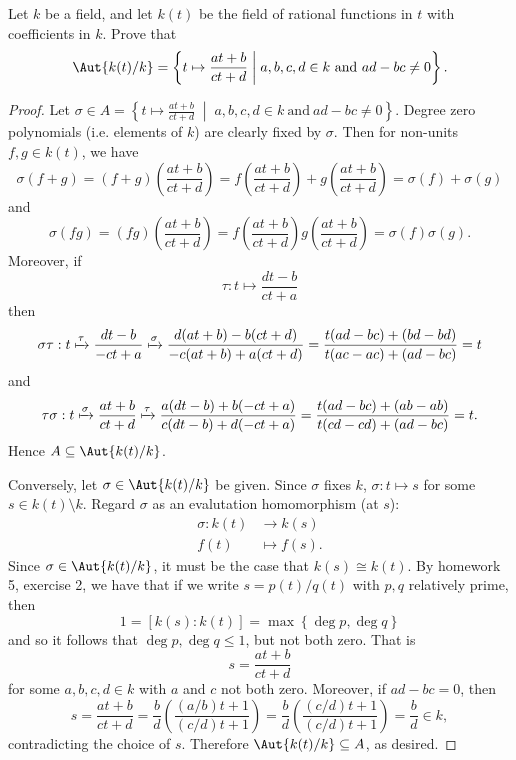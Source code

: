 \documentclass[10pt]{amsart}
\begin{document}
\begin{thm}
  Let $k$ be a field, and let $k(t)$ be the field of rational functions in $t$ with coefficients in $k$.
  Prove that 
  $$\Aut{k(t)/k} = \left\{t \mapsto \frac{at + b}{ct + d} \;\middle\vert\; a, b, c, d \in k\ \text{and}\ ad - bc \neq 0\right\}.$$
  
  \begin{proof}
    Let $\sigma \in A = \left\{t \mapsto \frac{at + b}{ct + d} \;\middle\vert\; a, b, c, d \in k\ \text{and}\ ad - bc \neq 0\right\}$.
    Degree zero polynomials (i.e. elements of $k$) are clearly fixed by $\sigma$.
    Then for non-units $f,g \in k(t)$, we have 
    $$\sigma(f + g) = (f + g)(\frac{at + b}{ct + d}) = f(\frac{at + b}{ct + d}) + g(\frac{at + b}{ct + d}) = \sigma(f) + \sigma(g)$$
    and
    $$\sigma(fg) = (fg)\left(\frac{at + b}{ct + d}\right) = f\left(\frac{at + b}{ct + d}\right) g\left(\frac{at + b}{ct + d}\right) = \sigma(f)\sigma(g).$$
    Moreover, if $$\tau \colon t \mapsto \frac{dt - b}{ct + a}$$
    then
    $$\sigma\tau: t \xmapsto{\tau} \frac{dt - b}{-ct + a} \xmapsto{\sigma} \frac{d(at + b) - b(ct + d)}{-c(at + b) + a(ct + d)} = \frac{t(ad - bc) + (bd - bd)}{t(ac - ac) + (ad - bc)} = t$$
    and
    $$\tau\sigma: t \xmapsto{\sigma} \frac{at + b}{ct + d} \xmapsto{\tau} \frac{a(dt - b) + b(-ct + a)}{c(dt - b) + d(-ct + a)} = \frac{t(ad - bc) + (ab - ab)}{t(cd - cd) + (ad - bc)} = t.$$
    Hence $A \subseteq \Aut{k(t)/k}$.
    
    Conversely, let $\sigma \in \Aut{k(t)/k}$ be given.
    Since $\sigma$ fixes $k$, $\sigma \colon t \mapsto s$ for some $s \in k(t) \setminus k$.
    Regard $\sigma$ as an evalutation homomorphism (at $s$):
    \begin{align*}
      \sigma \colon k(t) & \rightarrow k(s)\\
      f(t) & \mapsto f(s).
    \end{align*}
    Since $\sigma \in \Aut{k(t)/k}$, it must be the case that $k(s) \cong k(t)$.
    By homework 5, exercise 2, we have that if we write $s = p(t)/q(t)$ with $p, q$ relatively prime, then 
    $$1 = [k(s) : k(t)] = \max\left\{\deg{p}, \deg{q}\right\}$$
    and so it follows that $\deg{p}, \deg{q} \leq 1$, but not both zero.
    That is 
    $$s = \frac{at + b}{ct + d}$$ 
    for some $a,b,c,d \in k$ with $a$ and $c$ not both zero.
    Moreover, if $ad - bc = 0$, then 
    $$s = \frac{at + b}{ct + d} = \frac{b}{d} \left(\frac{(a/b)t + 1}{(c/d)t + 1}\right) = \frac{b}{d} \left(\frac{(c/d)t + 1}{(c/d)t + 1}\right) = \frac{b}{d} \in k,$$
    contradicting the choice of $s$.
    Therefore $\Aut{k(t)/k} \subseteq A$, as desired.
  \end{proof}
\end{thm}
\end{document}
